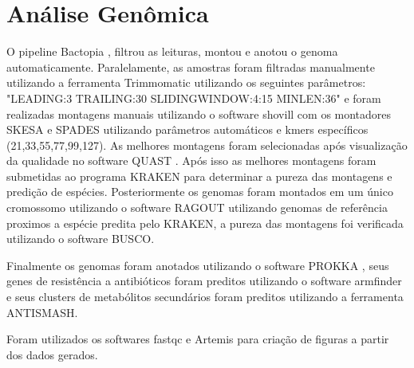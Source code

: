 \section{Análise Genômica}
O pipeline Bactopia \cite{Bactopia}, filtrou as leituras, montou e anotou o genoma automaticamente.
Paralelamente, as amostras foram filtradas manualmente utilizando a ferramenta Trimmomatic \cite{bolger2014trimmomatic}
utilizando os seguintes parâmetros: "LEADING:3 TRAILING:30 SLIDINGWINDOW:4:15 MINLEN:36"
e foram realizadas montagens manuais utilizando o software shovill com os montadores SKESA\cite{souvorov2018skesa} e SPADES\cite{bankevich2012spades} utilizando
parâmetros automáticos e kmers específicos (21,33,55,77,99,127).
As melhores montagens foram selecionadas após visualização da qualidade no software QUAST \cite{gurevich2013quast}. 
Após isso as melhores montagens foram submetidas ao programa KRAKEN \cite{wood2019improved} para determinar a pureza
das montagens e predição de espécies. Posteriormente os genomas foram montados em um único cromossomo
utilizando o software RAGOUT\cite{kolmogorov2014ragout} utilizando genomas de referência proximos a espécie predita pelo KRAKEN, 
a pureza das montagens foi verificada utilizando o software BUSCO\cite{simao2015busco}.

Finalmente os genomas foram anotados utilizando o software
PROKKA \cite{seemann2014prokka} , seus genes de resistência a antibióticos foram preditos utilizando o software armfinder e seus clusters de metabólitos
secundários foram preditos utilizando a ferramenta ANTISMASH\cite{blin2021antismash}.

Foram utilizados os softwares fastqc\cite{andrews2019fastqc} e Artemis\cite{carver2012artemis} para criação de figuras a partir dos dados gerados.
